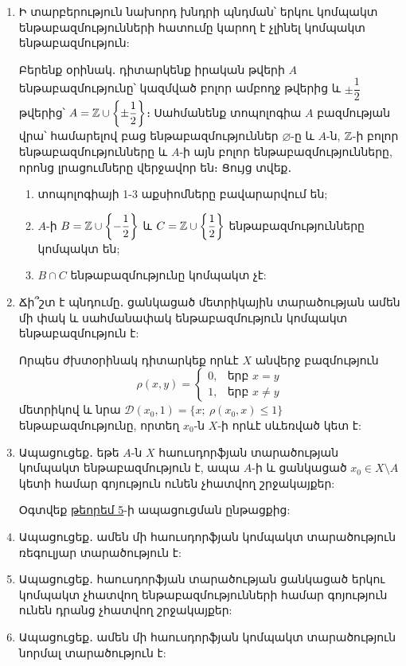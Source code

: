 \begin{enumerate}[label=\thesection.\arabic*.]
\item Ի տարբերություն նախորդ խնդրի պնդման՝ երկու կոմպակտ ենթաբազմու\-թ\-յուն\-ների հատումը կարող է չլինել կոմպակտ ենթաբազմություն:
\par Բերենք օրինակ․ դիտարկենք իրական թվերի $A$ ենթաբազմությունը՝ կազմված բոլոր ամբողջ թվերից և $\pm \dfrac{1}{2}$ թվերից՝ $A = \mathbb{Z} \cup \left\{\pm \dfrac{1}{2}\right\}$։ Սահմանենք տոպոլո\-գիա $A$ բազմության վրա՝ համարելով բաց ենթաբազմություններ $\varnothing$-ը և $A$-ն, $\mathbb{Z}$-ի բոլոր ենթաբազմությունները և $A$-ի այն բոլոր ենթաբազմությունները, որոնց լրացումները վերջավոր են։ Ցույց տվեք․
\begin{enumerate}
    \item[1.] տոպոլոգիայի 1-3 աքսիոմները բավարարվում են;
    \item[2.] $A$-ի $B = \mathbb{Z} \cup \left\{-\dfrac{1}{2}\right\}$ և $C = \mathbb{Z} \cup \left\{\dfrac{1}{2}\right\}$ ենթաբազմությունները կոմպակտ են;
    \item[3.] $B \cap C$ ենթաբազմությունը կոմպակտ չէ:
\end{enumerate}

\item Ճի՞շտ է պնդումը․ ցանկացած մետրիկային տարածության ամեն մի փակ և սահմանափակ ենթաբազմություն կոմպակտ ենթաբազմություն է:

\begin{hint}
Որպես ժխտօրինակ դիտարկեք որևէ $X$ անվերջ բազմություն 
\[
\rho(x, y) = \begin{cases}
    0, & \text{երբ } x=y \\
    1, & \text{երբ } x\ne y 
\end{cases}
\]
մետրիկով և նրա $\mathcal{D}(x_0, 1) = \{x;\ \rho(x_0, x) \le 1 \}$ ենթաբազմությունը, որտեղ $x_0$-ն $X$-ի որևէ սևեռված կետ է:
\end{hint}

\item Ապացուցեք․ եթե $A$-ն $X$ հաուսդորֆյան տարածության կոմպակտ ենթա\-բազ\-մություն է, ապա $A$-ի և ցանկացած $x_0 \in X \setminus A$ կետի համար գոյություն ունեն չհատվող շրջակայքեր:

\begin{hint}
Օգտվեք \hyperref[ch16thm5]{թեորեմ 5}-ի ապացուցման ընթացքից:
\end{hint}

\item Ապացուցեք․ ամեն մի հաուսդորֆյան կոմպակտ տարածություն ռեգուլյար տարա\-ծություն է:

\item Ապացուցեք․ հաուսդորֆյան տարածության ցանկացած երկու կոմպակտ չհատ\-վող ենթաբազմությունների համար գոյություն ունեն դրանց չհատվող շրջա\-կայ\-քեր:

\item Ապացուցեք․ ամեն մի հաուսդորֆյան կոմպակտ տարածություն նորմալ տարա\-ծություն է:

\end{enumerate}
